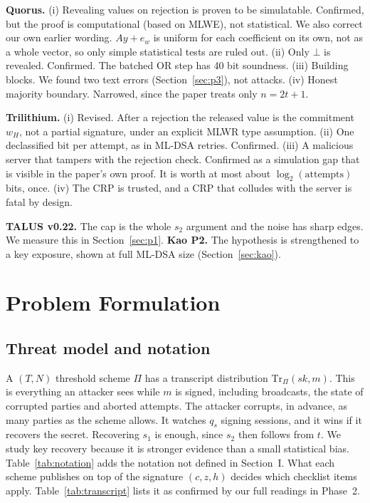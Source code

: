 \documentclass[10pt,conference,a4paper]{IEEEtran}
\begin{document}
\textbf{Quorus.} (i) Revealing values on rejection is proven to be simulatable. Confirmed, but the proof is computational
(based on MLWE), not statistical. We also correct our own earlier wording. $Ay+e_w$ is uniform for each coefficient on its
own, not as a whole vector, so only simple statistical tests are ruled out. (ii) Only $\bot$ is revealed. Confirmed. The
batched OR step has 40 bit soundness. (iii) Building blocks. We found two text errors (Section~\ref{sec:p3}), not attacks.
(iv) Honest majority boundary. Narrowed, since the paper treats only $n=2t+1$.

\textbf{Trilithium.} (i) Revised. After a rejection the released value is the commitment $w_H$, not a partial signature,
under an explicit MLWR type assumption. (ii) One declassified bit per attempt, as in ML-DSA retries. Confirmed. (iii) A
malicious server that tampers with the rejection check. Confirmed as a simulation gap that is visible in the paper's own
proof. It is worth at most about $\log_2(\text{attempts})$ bits, once. (iv) The CRP is trusted, and a CRP that colludes
with the server is fatal by design.

\textbf{TALUS v0.22.} The cap is the whole $s_2$ argument and the noise has sharp edges. We measure this in
Section~\ref{sec:p1}. \textbf{Kao P2.} The hypothesis is strengthened to a key exposure, shown at full ML-DSA size
(Section~\ref{sec:kao}).

\section{Problem Formulation}

\subsection{Threat model and notation}
A $(T,N)$ threshold scheme $\Pi$ has a transcript distribution $\mathrm{Tr}_\Pi(\mathit{sk},m)$. This is everything an
attacker sees while $m$ is signed, including broadcasts, the state of corrupted parties and aborted attempts. The attacker
corrupts, in advance, as many parties as the scheme allows. It watches $q_s$ signing sessions, and it wins if it recovers
the secret. Recovering $s_1$ is enough, since $s_2$ then follows from $t$. We study key recovery because it is stronger
evidence than a small statistical bias. Table~\ref{tab:notation} adds the notation not defined in Section~I. What each
scheme publishes on top of the signature $(c,z,h)$ decides which checklist items apply. Table~\ref{tab:transcript} lists it
as confirmed by our full readings in Phase~2.
\end{document}
